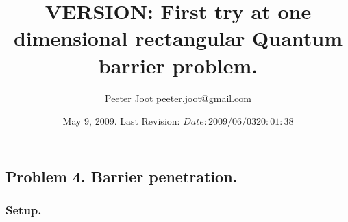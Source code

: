 \documentclass{article}
\title{ VERSION: First try at one dimensional rectangular Quantum barrier problem. }
\author{Peeter Joot \quad peeter.joot@gmail.com }
\date{ May 9, 2009.  Last Revision: $Date: 2009/06/03 20:01:38 $ }
\begin{document}
\maketitle{}
\tableofcontents
\section{}

%


\subsection{Problem 4.  Barrier penetration. }

\subsubsection{Setup. }
\end{document}
